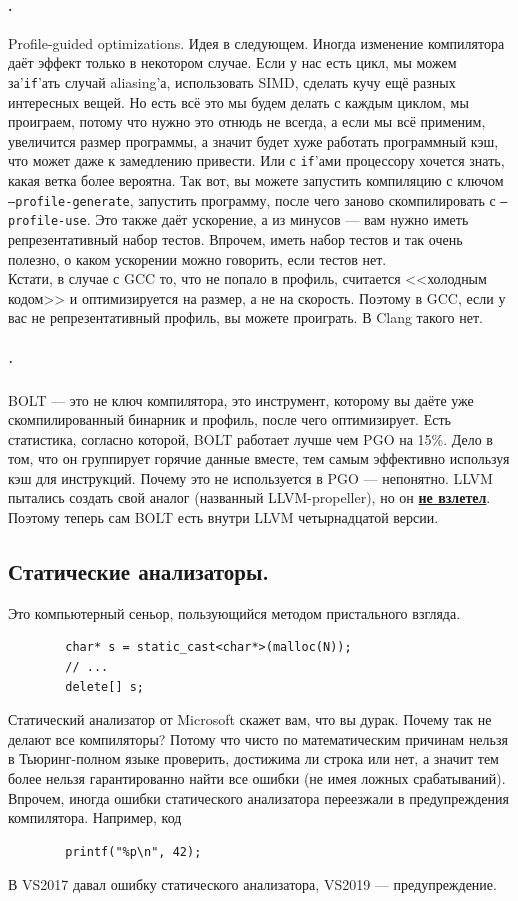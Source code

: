 \documentclass{article}
\begin{document}
    \paragraph{.}
    Profile-guided optimizations. Идея в следующем. Иногда изменение компилятора даёт эффект только в некотором случае. Если у нас есть цикл, мы можем за'\texttt{if}'ать случай aliasing'а, использовать SIMD, сделать кучу ещё разных интересных вещей. Но есть всё это мы будем делать с каждым циклом, мы проиграем, потому что нужно это отнюдь не всегда, а если мы всё применим, увеличится размер программы, а значит будет хуже работать программный кэш, что может даже к замедлению привести. Или с \texttt{if}'ами процессору хочется знать, какая ветка более вероятна. Так вот, вы можете запустить компиляцию с ключом \texttt{--profile-generate}, запустить программу, после чего заново скомпилировать с \texttt{--profile-use}. Это также даёт ускорение, а из минусов --- вам нужно иметь репрезентативный набор тестов. Впрочем, иметь набор тестов и так очень полезно, о каком ускорении можно говорить, если тестов нет.\\
    Кстати, в случае с GCC то, что не попало в профиль, считается <<холодным кодом>> и оптимизируется на размер, а не на скорость. Поэтому в GCC, если у вас не репрезентативный профиль, вы можете проиграть. В Clang такого нет.
    \subparagraph{.}
    BOLT --- это не ключ компилятора, это инструмент, которому вы даёте уже скомпилированный бинарник и профиль, после чего оптимизирует. Есть статистика, согласно которой, BOLT работает лучше чем PGO на 15\%. Дело в том, что он группирует горячие данные вместе, тем самым эффективно используя кэш для инструкций. Почему это не используется в PGO --- непонятно. LLVM пытались создать свой аналог (названный LLVM-propeller), но он \underline{\textbf{не взлетел}}. Поэтому теперь сам BOLT есть внутри LLVM четырнадцатой версии.
    \subsection{Статические анализаторы.}
    Это компьютерный сеньор, пользующийся методом пристального взгляда.
    \begin{verbatim}
        char* s = static_cast<char*>(malloc(N));
        // ...
        delete[] s;
    \end{verbatim}
    Статический анализатор от Microsoft скажет вам, что вы дурак. Почему так не делают все компиляторы? Потому что чисто по математическим причинам нельзя в Тьюринг-полном языке проверить, достижима ли строка или нет, а значит тем более нельзя гарантированно найти все ошибки (не имея ложных срабатываний). Впрочем, иногда ошибки статического анализатора переезжали в предупреждения компилятора. Например, код
    \begin{verbatim}
        printf("%p\n", 42);
    \end{verbatim}
    В VS2017 давал ошибку статического анализатора, VS2019 --- предупреждение.
\end{document}
